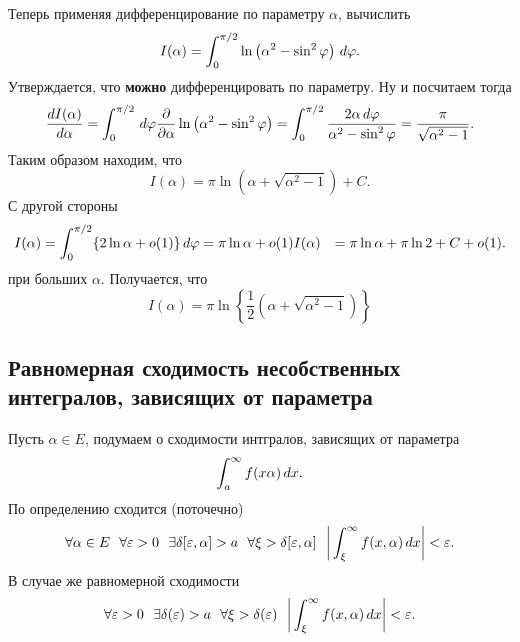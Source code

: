 Теперь применяя дифференцирование по параметру $\alpha$, вычислить
\begin{equation*}
    I(\alpha) = \int_0^{\pi/2}  \ln \left(
        \alpha^2 - \sin^2 \varphi
    \right) \, d \varphi.
\end{equation*}
Утверждается, что \textbf{можно} дифференцировать по параметру. Ну и посчитаем тогда
\begin{equation*}
    \frac{d I(\alpha)}{d \alpha} = \int_0^{\pi/2} \, d \varphi \frac{\partial }{\partial \alpha} \ln \left(\alpha^2 - \sin^2 \varphi\right) = 
    \int_0^{\pi/2} \frac{2\alpha \, d \varphi}{\alpha^2 - \sin^2 \varphi} = \frac{\pi}{\sqrt{\alpha^2-1}}.
\end{equation*}
Таким образом находим, что
\begin{equation*}
    I(\alpha) = \pi \ln ( \alpha + \sqrt{\alpha^2-1}) + C.
\end{equation*}
С другой стороны
\begin{align*}
    I(\alpha) &= \int_0^{\pi/2} \{2 \ln \alpha + o(1)\} \, d \varphi = \pi \ln \alpha + o(1)
    I(\alpha) &= \pi \ln \alpha + \pi \ln 2 + C + o(1).
\end{align*}
при больших $\alpha$. Получается, что
\begin{equation*}
    I(\alpha) = \pi \ln \left\{
        \frac{1}{2}\left(
            \alpha + \sqrt{\alpha^2-1}
        \right)
    \right\}
\end{equation*}


\subsection{Равномерная сходимость несобственных интегралов, зависящих от параметра}

Пусть $\alpha \in E$, подумаем о сходимости интгралов, зависящих от параметра
\begin{equation*}
    \int_a^{\infty} f(x \alpha) \, d x.
\end{equation*}
По определению сходится (поточечно)
\begin{equation*}
    \forall \alpha \in E \ \ 
    \forall \varepsilon > 0 \ \
    \exists \delta[\varepsilon, \alpha] > a \ \
    \forall \xi > \delta[\varepsilon, \alpha] \ \
    \bigg|
        \int_{\xi}^{\infty} f(x, \alpha) \d x
    \bigg| < \varepsilon.
\end{equation*}
В случае же равномерной сходимости
\begin{equation*}
    \forall \varepsilon > 0 \ \
    \exists \delta(\varepsilon) > a \ \ 
    \forall \xi > \delta(\varepsilon) \ \ 
    \bigg|
        \int_{\xi}^{\infty} f(x, \alpha) \d x
    \bigg| < \varepsilon.
\end{equation*}

